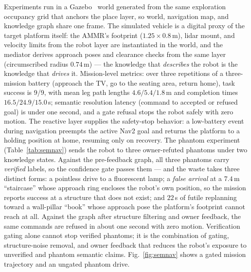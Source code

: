 Experiments run in a Gazebo~\cite{koenig2004gazebo} world generated from
the same exploration
occupancy grid that anchors the place layer, so world, navigation map, and
knowledge graph share one frame. The simulated vehicle is a digital proxy
of the target platform itself: the AMMR's footprint
($1.25\times0.8$\,m), lidar mount, and velocity limits from the robot
layer are instantiated in the world, and the mediator derives approach
poses and clearance checks from the same layer (circumscribed radius
$0.74$\,m) --- the knowledge that \emph{describes} the robot is the
knowledge that \emph{drives} it. Mission-level metrics: over three
repetitions of a three-mission battery (approach the TV, go to the
seating area, return home), task success is 9/9, with mean leg path
lengths $4.6/5.4/1.8$\,m and completion times $16.5/24.9/15.0$\,s;
semantic resolution latency (command to accepted or refused goal) is
under one second, and a gate refusal stops the robot safely with zero
motion. The reactive layer supplies the safety-stop behavior: a
low-battery event during navigation preempts the active Nav2 goal and
returns the platform to a holding position at home, resuming only on
recovery. The phantom experiment (Table~\ref{tab:semnav})
sends the robot to three owner-refuted phantoms under two knowledge
states. Against the pre-feedback graph, all three phantoms carry
\emph{verified} labels, so the confidence gate passes them --- and the
waste takes three distinct forms: a pointless drive to a fluorescent
lamp; a \emph{false arrival} at a $7.4$\,m ``staircase'' whose approach
ring encloses the robot's own position, so the mission reports success at
a structure that does not exist; and $22$\,s of futile replanning toward
a wall-pillar ``book'' whose approach pose the platform's footprint
cannot reach at all. Against the graph after structure filtering and
owner feedback, the same commands are refused in about one second with
zero motion. Verification gating alone cannot stop verified phantoms; it
is the combination of gating, structure-noise removal, and owner
feedback that reduces the robot's exposure to unverified and phantom
semantic claims. Fig.~\ref{fig:semnav}
shows a gated mission trajectory and an ungated phantom drive.

